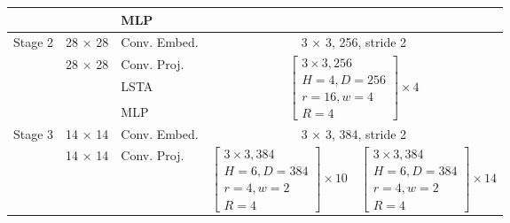 \begin{table}[]
\begin{tabular}{c|c|l|c|c}
                         &                              & MLP          & \multicolumn{2}{c}{}                                                                                                                                                                                       \\ \hline
\multirow{4}{*}{Stage 2} & 28 $\times$ 28                  & Conv. Embed. & \multicolumn{2}{c}{3 $\times$ 3, 256, stride 2}                                                                                                                                                               \\ \cline{2-5} 
                         & \multirow{4}{*}{28 $\times$ 28} & Conv. Proj.  & \multicolumn{2}{c}{\multirow{4}{*}{$\begin{bmatrix}3\times 3, 256\\ H=4, D=256 \\ r=16, w=4\\ R=4\end{bmatrix}\times 4$}}                                                                                   \\
                         &                              & \multirow{2}{*}{LSTA}    & \multicolumn{2}{c}{}         \\
                         &                              &                          & \multicolumn{2}{c}{}               \\
                         &                              & MLP          & \multicolumn{2}{c}{}                                                                                                                                                                                       \\ \hline
\multirow{4}{*}{Stage 3} & 14 $\times$ 14                  & Conv. Embed. & \multicolumn{2}{c}{3 $\times$ 3, 384, stride 2}                                                                                                                                                               \\ \cline{2-5} 
                         & \multirow{4}{*}{14 $\times$ 14} & Conv. Proj.  & \multirow{4}{*}{$\begin{bmatrix} 3\times 3, 384\\ H=6, D=384 \\ r=4, w=2\\ R=4\end{bmatrix}\times 10$} & \multirow{4}{*}{$\begin{bmatrix} 3\times 3, 384\\ H=6, D=384 \\ r=4, w=2\\ R=4\end{bmatrix}\times 14$} \\

\end{tabular}
\end{table}
